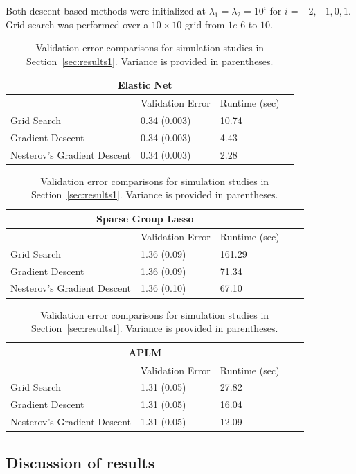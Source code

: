 \documentclass[12pt,letterpaper]{article}
\begin{document}
Both descent-based methods were initialized at $\lambda_1 = \lambda_2 = 10^i$ for $i=-2, -1, 0, 1$. Grid search was performed over a $10 \times 10$ grid from $1e\text{-}6$ to $10$.
\begin{table} 
\begin{center}

\begin{tabular}{| l | l | l | l | }
\hline
\multicolumn{3}{|c|}{Elastic Net}\\
\hline
 & Validation Error & Runtime (sec) \\
\hline
Grid Search & 0.34 (0.003) & 10.74\\
\hline
Gradient Descent & 0.34 (0.003) & 4.43 \\
\hline
Nesterov's Gradient Descent & 0.34 (0.003) & 2.28 \\
\hline
\end{tabular}


\begin{tabular}{| l | l | l | l | l | }
\hline
\multicolumn{3}{|c|}{Sparse Group Lasso}\\
\hline
 & Validation Error & Runtime (sec) \\
\hline
Grid Search & 1.36 (0.09) & 161.29 \\
\hline
Gradient Descent  & 1.36 (0.09) & 71.34 \\
\hline
Nesterov's Gradient Descent  & 1.36 (0.10) & 67.10 \\
\hline
\end{tabular}

\begin{tabular}{| l | l | l | l | l | }
\hline
\multicolumn{3}{|c|}{APLM}\\
\hline
 & Validation Error & Runtime (sec) \\
\hline
Grid Search  & 1.31 (0.05) & 27.82 \\
\hline
Gradient Descent  & 1.31 (0.05) & 16.04 \\
\hline
Nesterov's Gradient Descent  & 1.31 (0.05) & 12.09 \\
\hline
\end{tabular}

\end{center}
\caption {Validation error comparisons for simulation studies in Section~\ref{sec:results1}. Variance is provided in parentheses.}
\label{table:validation}
\end{table}

\subsection{Discussion of results}
\end{document}
